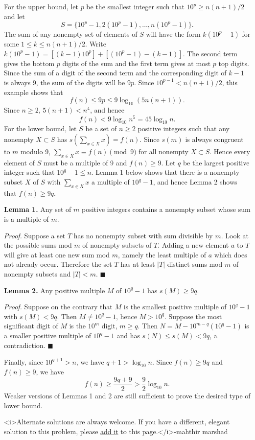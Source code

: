 \begin{enumerate}
For the upper bound, let $p$ be the smallest integer such that $10^p\geq n(n+1)/2$ and let
 \[S = \{10^p - 1, 2(10^p - 1), \ldots, n(10^p - 1)\}.\]The sum of any nonempty set of elements of $S$ will have the form $k(10^p - 1)$ for some $1\leq k\leq n(n+1)/2$. Write $k(10^p - 1) = [(k - 1)10^p] + [(10^p - 1) - (k - 1)]$. The second term gives the bottom $p$ digits of the sum and the first term gives at most $p$ top digits. Since the sum of a digit of the second term and the corresponding digit of $k - 1$ is always 9, the sum of the digits will be $9p$. Since $10^{p-1} < n(n+1)/2$, this example shows that
 \[f(n)\leq 9p\leq 9\log_{10}(5n(n+1)).\]Since $n\geq 2$, $5(n + 1) < n^4$, and hence
 \[f(n) < 9\log_{10}n^5 = 45\log_{10}n.\]For the lower bound, let $S$ be a set of $n\geq 2$ positive integers such that any nonempty $X\subset S$ has $s\left(\sum_{x\in X} x\right) = f(n)$. Since $s(m)$ is always congruent to $m$ modulo 9, $\sum_{x\in X} x\equiv f(n)\pmod{9}$ for all nonempty $X\subset S$. Hence every element of $S$ must be a multiple of 9 and $f(n)\geq 9$. Let $q$ be the largest positive integer such that $10^q - 1\leq n$. Lemma 1 below shows that there is a nonempty subset $X$ of $S$ with $\sum_{x\in X} x$ a multiple of $10^q - 1$, and hence Lemma 2 shows that $f(n)\geq 9q$.

 \textbf{Lemma 1.} Any set of $m$ positive integers contains a nonempty subset whose sum is a multiple of $m$.

 \textit{Proof.} Suppose a set $T$ has no nonempty subset with sum divisible by $m$. Look at the possible sums mod $m$ of nonempty subsets of $T$. Adding a new element $a$ to $T$ will give at least one new sum mod $m$, namely the least multiple of $a$ which does not already occur. Therefore the set $T$ has at least $|T|$ distinct sums mod $m$ of nonempty subsets and $|T| < m$. $\blacksquare$

 \textbf{Lemma 2.} Any positive multiple $M$ of $10^q - 1$ has $s(M)\geq 9q$.

 \textit{Proof.} Suppose on the contrary that $M$ is the smallest positive multiple of $10^q - 1$ with $s(M) < 9q$. Then $M\neq 10^q - 1$, hence $M > 10^q$. Suppose the most significant digit of $M$ is the $10^m$ digit, $m\geq q$. Then $N = M - 10^{m-q}(10^q - 1)$ is a smaller positive multiple of $10^q - 1$ and has $s(N)\leq s(M) < 9q$, a contradiction. $\blacksquare$

 Finally, since $10^{q+1} > n$, we have $q + 1 > \log_{10} n$. Since $f(n)\geq 9q$ and $f(n)\geq 9$, we have
 \[f(n)\geq \frac{9q + 9}{2} > \frac{9}{2}\log_{10}n.\]Weaker versions of Lemmas 1 and 2 are still sufficient to prove the desired type of lower bound.

 <i>Alternate solutions are always welcome. If you have a different, elegant solution to this problem, please \href{https://artofproblemsolving.com/wiki/index.php?title=2005\_USAMO\_Problems/Problem\_6&action=edit}{add it} to this page.</i>-mahthir marshad

 


\end{enumerate}